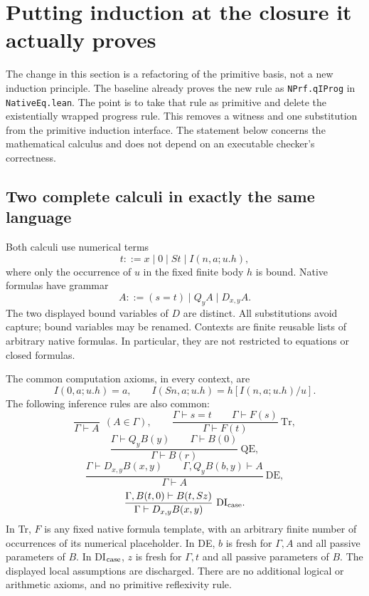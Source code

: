 
\section{Putting induction at the closure it actually proves}

The change in this section is a refactoring of the primitive basis, not a
new induction principle.  The baseline already proves the new rule as
\texttt{NPrf.qIProg} in \texttt{NativeEq.lean}.  The point is to take that
rule as primitive and delete the existentially wrapped progress rule.
This removes a witness and one substitution from the primitive induction
interface.  The statement below concerns the mathematical calculus and
does not depend on an executable checker's correctness.

\subsection{Two complete calculi in exactly the same language}

Both calculi use numerical terms
\[
 t ::= x\mid 0\mid S t\mid I(n,a;u.h),
\]
where only the occurrence of $u$ in the fixed finite body $h$ is bound.
Native formulas have grammar
\[
 A ::= (s=t)\mid Q_y A\mid D_{x,y}A.
\]
The two displayed bound variables of $D$ are distinct.  All substitutions
avoid capture; bound variables may be renamed.  Contexts are finite
reusable lists of arbitrary native formulas.  In particular, they are
not restricted to equations or closed formulas.

The common computation axioms, in every context, are
\[
 I(0,a;u.h)=a,\qquad
 I(Sn,a;u.h)=h[I(n,a;u.h)/u].
\]
The following inference rules are also common:
\[
 \frac{}{\Gamma\vdash A}\ \ (A\in\Gamma),
 \qquad
 \frac{\Gamma\vdash s=t\qquad\Gamma\vdash F(s)}
      {\Gamma\vdash F(t)}\ \mathrm{Tr},
\]
\[
 \frac{\Gamma\vdash Q_yB(y)\qquad\Gamma\vdash B(0)}
      {\Gamma\vdash B(r)}\ \mathrm{QE},
\]
\[
 \frac{\Gamma\vdash D_{x,y}B(x,y)\qquad
       \Gamma,Q_yB(b,y)\vdash A}
      {\Gamma\vdash A}\ \mathrm{DE},
\]
\[
 \frac{\Gamma,B(t,0)\vdash B(t,Sz)}
      {\Gamma\vdash D_{x,y}B(x,y)}\ \mathrm{DI}_{\rm case}.
\]
In Tr, $F$ is any fixed native formula template, with an arbitrary finite
number of occurrences of its numerical placeholder.  In DE, $b$ is fresh
for $\Gamma,A$ and all passive parameters of $B$.  In DI$_{\rm case}$,
$z$ is fresh for $\Gamma,t$ and all passive parameters of $B$.  The
displayed local assumptions are discharged.  There are no additional
logical or arithmetic axioms, and no primitive reflexivity rule.

